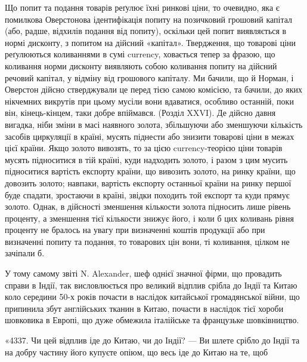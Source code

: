 Що попит та подання товарів реґулює їхні ринкові ціни, то очевидно, яка
є помилкова Оверстонова ідентифікація попиту на позичковий грошовий капітал
(або, радше, відхилів подання від попиту), оскільки цей попит виявляється
в нормі дисконту, з попитом на дійсний «капітал». Твердження, що товарові
ціни реґулюються коливаннями в сумі currency, ховається тепер за фразою, що
коливання норми дисконту виявляють собою коливання попиту на дійсний речовий
капітал, у відміну від грошового капіталу. Ми бачили, що й Норман, і
Оверстон дійсно стверджували це перед тією самою комісією, та бачили, до яких
нікчемних викрутів при цьому мусіли вони вдаватися, особливо останній, поки
він, кінець-кінцем, таки добре впіймався. (Розділ XXVI). Де дійсно давня вигадка,
ніби зміни в масі наявного золота, збільшуючи або зменшуючи кількість
засобів циркуляції в країні, мусять піднести або знизити товарові ціни в межах
цієї країни. Якщо золото вивозять, то за цією currency-теорією ціни товарів
мусять підноситися в тій країні, куди надходить золото, і разом з цим мусить
підноситися вартість експорту країни, що вивозить золото, на ринку країни, що
довозить золото; навпаки, вартість експорту останньої країни на ринку першої
буде спадати, зростаючи в країні, звідки походить той експорт та куди прямує
золото. Однак, в дійсності зменшення кількости золота підносить лише рівень проценту,
а зменшення тієї кількости знижує його, і коли б цих коливань рівня проценту
не бралось на увагу при визначенні коштів продукції або при визначенні
попиту та подання, то товарових цін вони, ті коливання, цілком не зачіпали б.

У тому самому звіті N. Alexander, шеф однієї значної фірми, що провадить
справи в Індії, так висловлюється про великий відплив срібла до Індії та Китаю
коло середини 50-х років почасти в наслідок китайської громадянської війни, що
припинила збут англійських тканин в Китаю, почасти в наслідок тієї хороби
шовковика в Европі, що дуже обмежила італійське та французьке шовківництво.

«4337. Чи цей відплив іде до Китаю, чи до Індії? — Ви шлете срібло до
Індії та на добру частину його купуєте опіюм, що весь іде до Китаю на те, щоб
\parbreak{}  %
